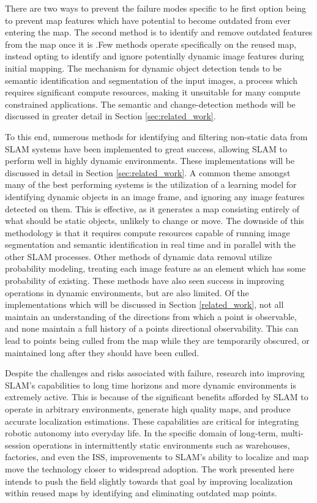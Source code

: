 There are two ways to prevent the failure modes specific to he first option being to prevent map features which have potential to become outdated from ever entering the map. The second method is to identify and remove outdated features from the map once it is .Few methods operate specifically on the reused map, instead opting to identify and ignore potentially dynamic image features during initial mapping. The mechanism for dynamic object detection tends to be semantic identification and segmentation of the input images, a process which requires significant compute resources, making it unsuitable for many compute constrained applications. The semantic and change-detection methods will be discussed in greater detail in Section \ref{sec:related_work}.

To this end, numerous methods for identifying and filtering non-static data from SLAM systems have been implemented to great success, allowing SLAM to perform well in highly dynamic environments. These implementations will be discussed in detail in Section \ref{sec:related_work}. A common theme amongst many of the best performing systems is the utilization of a learning model for identifying dynamic objects in an image frame, and ignoring any image features detected on them. This is effective, as it generates a map consisting entirely of what should be static objects, unlikely to change or move. The downside of this methodology is that it requires compute resources capable of running image segmentation and semantic identification in real time and in parallel with the other SLAM processes. Other methods of dynamic data removal utilize probability modeling, treating each image feature as an element which has some probability of existing. These methods have also seen success in improving operations in dynamic environments, but are also limited. Of the implementations which will be discussed in Section \ref{related_work}, not all maintain an understanding of the directions from which a point is observable, and none maintain a full history of a points directional observability. This can lead to points being culled from the map while they are temporarily obscured, or maintained long after they should have been culled.


Despite the challenges and risks associated with failure, research into improving SLAM's capabilities to long time horizons and more dynamic environments is extremely active. This is because of the significant benefits afforded by SLAM to operate in arbitrary environments, generate high quality maps, and produce accurate localization estimations. These capabilities are critical for integrating robotic autonomy into everyday life. In the specific domain of long-term, multi-session operations in intermittently static environments such as warehouses, factories, and even the ISS, improvements to SLAM's ability to localize and map move the technology closer to widespread adoption.  The work presented here intends to push the field slightly towards that goal by improving localization within reused maps by identifying and eliminating outdated map points.

